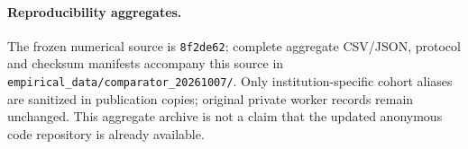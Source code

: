 {\paragraph{Reproducibility aggregates.}
The frozen numerical source is \texttt{8f2de62}; complete aggregate CSV/JSON,
protocol and checksum manifests accompany this source in
\texttt{empirical\_data/comparator\_20261007/}. Only institution-specific cohort
aliases are sanitized in publication copies; original private worker records
remain unchanged. This aggregate archive is not a claim that the updated
anonymous code repository is already available.







}
